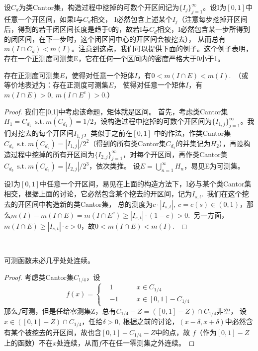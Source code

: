 \documentclass[color=green,thmcnt=section,lang=cn,12pt]{elegantbook}
\numberwithin{equation}{section}%
\numberwithin{figure}{section}%
\newcommand{\sothat}{\ \textrm{s.t.}\ }
\newcommand{\cu}[1]{\bigcup_{#1=1}^{\infty}} %
\begin{document}
设$C_{d}$为类Cantor集，构造过程中挖掉的可数个开区间记为$\{I_{j}\}_{j=1}^{\infty}$。设I为$[0,1]$中任意一个开区间，如果I与$C_{d}$相交，
I必然包含上述某个$I_{j}$（注意每步挖掉开区间后，得到的若干闭区间长度是趋于0的，故若I与$C_{d}$相交，I必然包含某一步所得到的闭区间，在下一步时，这个闭区间中心的开区间会被挖去），
从而总有$m(I\cap C_{d})<m(I)$。注意到这点，我们可以提供下面的例子。这个例子表明，存在一个正测度可测集E，它在任何一个区间内的密度严格大于0小于1。\\
\begin{example}\label{zhengcedujibuwanquanbaohanjuti}
    存在正测度可测集$E$，使得对任意一个矩体$I$，有$0<m(I\cap E)<m(I)$.\ （或等价地表述为：存在正测度可测集$E$，
    使得对任意一个矩体$I$，有$m(I\cap E)>0,\ m(I\cap E^c)>0$.）
\end{example}
\begin{proof}
    我们在[0,1]中考虑该命题，矩体就是区间。
    首先，考虑类Cantor集$H_1=C_{d_1}\ \sothat m(C_{d_1})=1/2$，设构造过程中挖掉的可数个开区间为$\{I_{1,j}\}_{j=1}^{\infty}$。我们对挖去的每个开区间$I_{1,j}$，类似于之前在$[0,1]$
    中的作法，作类Cantor集$C_{d_2}\ \sothat m(C_{d_2})=|I_{1,j}|/2^2$（得到的所有类Cantor集$C_{d_2}$的并集记为$H_2$），再设构造过程中挖掉的所有开区间为$\{I_{2,j}\}_{j=1}^{\infty}$，对每个开区间，再作类Cantor集$C_{d_3}\ \sothat m(C_{d_3})=|I_{2,j}|/2^3$，依次类推。
    设$E=\cu{n}H_n$，易见E为可测集。


    设I为$[0,1]$中任意一个开区间，易见在上面的构造方法下，I必与某个类Cantor集相交，根据上面的讨论，它必然包含某个挖去的开区间，记为$I_{s,t}$.\ 
    我们在这个挖去的开区间中构造新的类Cantor集，
    总的测度为$c\cdot |I_{s,t}|,\ c=c(s)\in(0,1)$，那么$m(I)-m(I\cap E)=m(I\cap E^c)\geq |I_{s,t}|\cdot (1-c)>0$.\ 
    另一方面，$m(I\cap E)\geq |I_{s,t}|\cdot c>0$，故$0<m(I\cap E)<m(I)$.\ 
\end{proof}
\ 


\begin{example}\label{kecehanshubujihuchuchulianxu}
    可测函数未必几乎处处连续。
\end{example}
\begin{proof}
    考虑类Cantor集$C_{1/4}$，设$$f(x)=\left\{
        \begin{aligned}
            &1&\quad&x\in C_{1/4}\\
            &-1&\quad&x\in [0,1]-C_{1/4}
        \end{aligned}
    \right. $$
    那么$f$可测，但是任给零测集Z，总有$C_{1/4}-Z=([0,1]-Z)\cap C_{1/4}$非空，
    设$x\in ([0,1]-Z)\cap C_{1/4}$，任给$\delta>0,\ $根据之前的讨论，$(x-\delta,x+\delta)$中必然含有某个被挖去的开区间，故也含$[0,1]-C_{1/4}-Z$中的点，故
    $f$（作为$[0,1]-Z$上的函数）不在$x$处连续，从而$f$不在任一零测集之外连续。
\end{proof}
\ 
\end{document}
